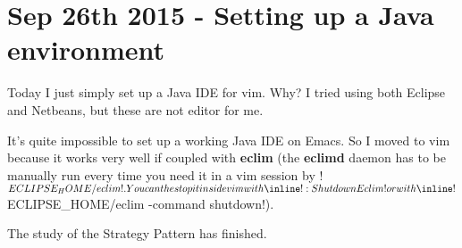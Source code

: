 \section{Sep 26th 2015 - Setting up a Java environment}

Today I just simply set up a Java IDE for vim. Why? I tried using both
Eclipse and Netbeans, but these are not editor for me.

It's quite impossible to set up a working Java IDE on Emacs. So I
moved to vim because it works very well if coupled with \textbf{eclim}
(the \textbf{eclimd} daemon has to be manually run every time you need
it in a vim session by
\inline!$ECLIPSE_HOME/eclim!. You can the stop it inside vim with
\inline!:ShutdownEclim! or with
\inline!$ECLIPSE_HOME/eclim -command shutdown!).

The study of the Strategy Pattern has finished.
